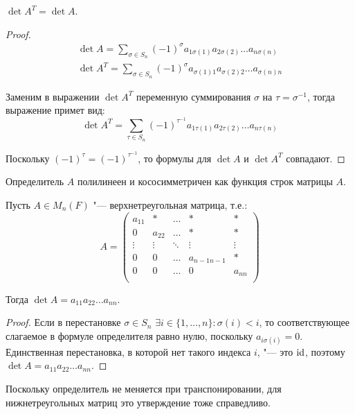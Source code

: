 \begin{theorem}
	$\det{A^T} = \det{A}$.
\end{theorem}

\begin{proof}
	\begin{gather*}
		\det{A} = \sum_{\sigma \in S_n}(-1)^\sigma a_{1\sigma(1)}a_{2\sigma(2)}\dots a_{n\sigma(n)}\\
		\det{A^T} = \sum_{\sigma \in S_n}(-1)^\sigma a_{\sigma(1)1}a_{\sigma(2)2}\dots a_{\sigma(n)n}
	\end{gather*}
	
	Заменим в выражении $\det{A^T}$ переменную суммирования $\sigma$ на $\tau = \sigma^{-1}$, тогда выражение примет вид:
	\[\det{A^T} = \sum_{\tau \in S_n}(-1)^{\tau^{-1}} a_{1\tau(1)}a_{2\tau(2)}\dots a_{n\tau(n)}\]
	
	Поскольку $(-1)^\tau = (-1)^{\tau^{-1}}$, то формулы для $\det{A}$ и $\det{A^T}$ совпадают.
\end{proof}

\begin{corollary}
	Определитель $A$ полилинеен и кососимметричен как функция строк матрицы $A$.
\end{corollary}

\begin{proposition}
	Пусть $A \in M_n(F)$ "--- верхнетреугольная матрица, т.\:е.:
	\[A = \begin{pmatrix}
	a_{11} & * & \dots & * & *\\ 
	0 & a_{22} & \dots & * & *\\ 
	\vdots & \vdots & \ddots & \vdots & \vdots\\
	0 & 0 & \dots & a_{n-1n-1} & *\\
	0 & 0 & \dots & 0 & a_{nn}\\
	\end{pmatrix}\]
	
	Тогда $\det{A} = a_{11}a_{22}\dots a_{nn}$.
\end{proposition}

\begin{proof}
	Если в перестановке $\sigma \in S_n$ $\exists i \in \{1, \dots, n\}: \sigma(i) < i$, то соответствующее слагаемое в формуле определителя равно нулю, поскольку $a_{i \sigma(i)} = 0$. Единственная перестановка, в которой нет такого индекса $i$, "--- это $\mathrm{id}$, поэтому $\det{A} = a_{11}a_{22}\dots a_{nn}$.
\end{proof}

\begin{note}
	Поскольку определитель не меняется при транспонировании, для нижнетреугольных матриц это утверждение тоже справедливо.
\end{note}

